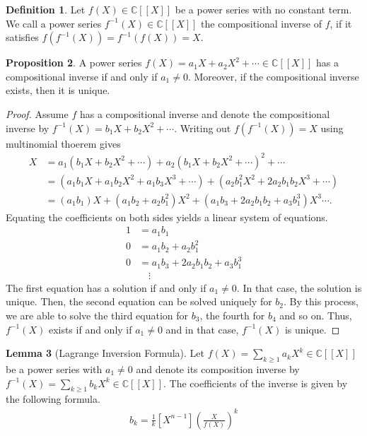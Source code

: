 \documentclass[a4paper]{article}
\theoremstyle{definition}
\newtheorem{definition}{Definition}[]
\newtheorem{lemma}[definition]{Lemma}
\newtheorem{proposition}[definition]{Proposition}
\begin{document}
\begin{definition}
    Let \(f(X) \in \mathbb{C}[[X]]\) be a power series with no constant term. We call a power series \(f^{-1}(X) \in \mathbb{C}[[X]]\) the compositional inverse of \(f\), if it satisfies \(f(f^{-1}(X)) = f^{-1}(f(X)) = X\). 
\end{definition}
\begin{proposition}
    A power series \(f(X) = a_1 X + a_2 X^2 + \cdots\in \mathbb{C}[[X]]\) has a compositional inverse if and only if \(a_1 \neq 0\). Moreover, if the compositional inverse exists, then it is unique. 
\end{proposition}
\begin{proof}
    Assume \(f\) has a compositional inverse and denote the compositional inverse by \(f^{-1}(X) = b_1 X + b_2 X^2 + \cdots\). Writing out \(f(f^{-1}(X)) = X\) using multinomial thoerem gives
    \begin{align*}
        X &= a_1 (b_1 X + b_2 X^2 + \cdots) + a_2 (b_1 X + b_2 X^2 + \cdots)^2 + \cdots \\
        &= (a_1 b_1 X + a_1 b_2 X^2 + a_1 b_3 X^3 + \cdots) + (a_2 b_1^2 X^2 + 2 a_2 b_1 b_2 X^3 + \cdots) \\
        &= (a_1 b_1) X + (a_1 b_2 + a_2 b_1^2) X^2 + (a_1b_3 + 2 a_2 b_1 b_2 + a_3 b_1^3) X^3 \cdots\text{.}
    \end{align*}
    Equating the coefficients on both sides yields a linear system of equations.
    \begin{align*}
        1 &= a_1 b_1 \\
        0 &= a_1 b_2 + a_2 b_1^2 \\
        0 &= a_1b_3 + 2 a_2 b_1 b_2 + a_3 b_1^3 \\
        & \quad\vdots
    \end{align*}
    The first equation has a solution if and only if \(a_1 \neq 0\). In that case, the solution is unique. Then, the second equation can be solved uniquely for \(b_2\). By this process, we are able to solve the third equation for \(b_3\), the fourth for \(b_4\) and so on. Thus, \(f^{-1}(X)\) exists if and only if \(a_1 \neq 0\) and in that case, \(f^{-1}(X)\) is unique.
\end{proof}
\begin{lemma}[Lagrange Inversion Formula]
    Let \(f(X) = \sum_{k \geq 1} a_k X^k \in \mathbb{C}[[X]]\) be a power series with \(a_1 \neq 0\) and denote its composition inverse by \(f^{-1}(X) = \sum_{k \geq 1}b_k X^k \in \mathbb{C}[[X]]\). The coefficients of the inverse is given by the following formula.
    \begin{align*}
        b_k = \frac{1}{k} [X^{n - 1}] \left(\frac{X}{f(X)}\right)^k
    \end{align*}
\end{lemma}
\end{document}
